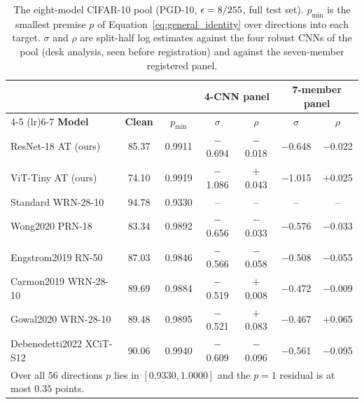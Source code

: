 \begin{table}[!t]
\centering
\caption{The eight-model CIFAR-10 pool (PGD-10, $\epsilon = 8/255$, full test set). $p_{\min}$ is the smallest premise $p$ of Equation~\eqref{eq:general_identity} over directions into each target. $\sigma$ and $\rho$ are split-half log estimates against the four robust CNNs of the pool (desk analysis, seen before registration) and against the seven-member registered panel.}
\label{tab:external_pool}
\scriptsize
\setlength{\tabcolsep}{2pt}
\begin{tabular}{lcccccc}
\toprule
& & & \multicolumn{2}{c}{\textbf{4-CNN panel}} & \multicolumn{2}{c}{\textbf{7-member panel}} \\
\cmidrule(lr){4-5} \cmidrule(lr){6-7}
\textbf{Model} & \textbf{Clean} & \textbf{$p_{\min}$} & \textbf{$\sigma$} & \textbf{$\rho$} & \textbf{$\sigma$} & \textbf{$\rho$} \\
\midrule
ResNet-18 AT (ours) & 85.37 & 0.9911 & $-$0.694 & $-$0.018 & $-$0.648 & $-$0.022 \\
ViT-Tiny AT (ours) & 74.10 & 0.9919 & $-$1.086 & $+$0.043 & $-$1.015 & $+$0.025 \\
Standard WRN-28-10 & 94.78 & 0.9330 & -- & -- & -- & -- \\
Wong2020 PRN-18 & 83.34 & 0.9892 & $-$0.656 & $-$0.033 & $-$0.576 & $-$0.033 \\
Engstrom2019 RN-50 & 87.03 & 0.9846 & $-$0.566 & $-$0.058 & $-$0.508 & $-$0.055 \\
Carmon2019 WRN-28-10 & 89.69 & 0.9884 & $-$0.519 & $+$0.008 & $-$0.472 & $-$0.009 \\
Gowal2020 WRN-28-10 & 89.48 & 0.9895 & $-$0.521 & $+$0.083 & $-$0.467 & $+$0.065 \\
Debenedetti2022 XCiT-S12 & 90.06 & 0.9940 & $-$0.609 & $-$0.096 & $-$0.561 & $-$0.095 \\
\bottomrule
\multicolumn{7}{p{0.95\columnwidth}}{\scriptsize Over all $56$ directions $p$ lies in $[0.9330, 1.0000]$ and the $p=1$ residual is at most $0.35$ points.}
\end{tabular}
\end{table}

